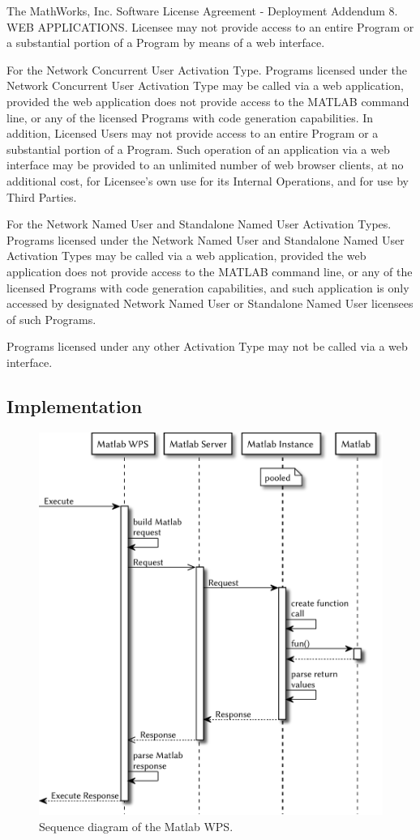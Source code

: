 	\begin{signedquote}{The MathWorks, Inc. Software License Agreement - Deployment Addendum}
		8. WEB APPLICATIONS.  Licensee may not provide access to an entire Program
		or a substantial portion of a Program by means of a web interface.

		For the Network Concurrent User Activation Type.  Programs licensed under the
		Network Concurrent User Activation Type may be called via a web application,
		provided the web application does not provide access to the MATLAB command
		line, or any of the licensed Programs with code generation capabilities.  In
		addition, Licensed Users may not provide access to an entire Program or a
		substantial portion of a Program.  Such operation of an application via a web
		interface may be provided to an unlimited number of web browser clients, at no
		additional cost, for Licensee's own use for its Internal Operations, and for
		use by Third Parties.

		For the Network Named User and Standalone Named User Activation Types.
		Programs licensed under the Network Named User and Standalone Named User
		Activation Types may be called via a web application, provided the web
		application does not provide access to the MATLAB command line, or any of the
		licensed Programs with code generation capabilities, and such application is
		only accessed by designated Network Named User or Standalone Named User
		licensees of such Programs.

		Programs licensed under any other Activation Type may not be called via a web
		interface.
	\end{signedquote}
	\subsection{Implementation}
	\begin{figure}[!htb]
		\centering
		\includegraphics[width=.8\textwidth]{figures/sequence-diagramm-mwps.pdf}
		\caption{\label{fig:sd:mwps} Sequence diagram of the Matlab WPS.} %
	\end{figure}
